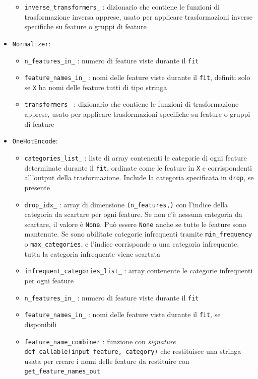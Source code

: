 \begin{itemize}
\begin{itemize}
        \item \texttt{inverse\_transformers\_} : dizionario che contiene le funzioni di trasformazione inversa apprese, usato per applicare trasformazioni inverse specifiche su feature o gruppi di feature
    \end{itemize}
    \item \texttt{Normalizer}:
    \begin{itemize}
        \item \texttt{n\_features\_in\_} : numero di feature viste durante il \texttt{fit}
        \item \texttt{feature\_names\_in\_} : nomi delle feature viste durante il \texttt{fit}, definiti solo se \texttt{X} ha nomi delle feature tutti di tipo stringa
        \item \texttt{transformers\_} : dizionario che contiene le funzioni di trasformazione apprese, usato per applicare trasformazioni specifiche su feature o gruppi di feature
    \end{itemize}
    \item \texttt{OneHotEncode}: 
    \begin{itemize}
        \item \texttt{categories\_list\_} : liste di array contenenti le categorie di ogni feature determinate durante il \texttt{fit}, ordinate come le feature in \texttt{X} e corrispondenti all'output della trasformazione. Include la categoria specificata in \texttt{drop}, se presente
        \item \texttt{drop\_idx\_} : array di dimensione \texttt{(n\_features,)} con l'indice della categoria da scartare per ogni feature. Se non c'è nessuna categoria da scartare, il valore è \texttt{None}. Può essere \texttt{None} anche se tutte le feature sono mantenute. Se sono abilitate categorie infrequenti tramite \texttt{min\_frequency} o \texttt{max\_categories}, e l'indice corrisponde a una categoria infrequente, tutta la categoria infrequente viene scartata
        \item \texttt{infrequent\_categories\_list\_} : array contenente le categorie infrequenti per ogni feature
        \item \texttt{n\_features\_in\_} : numero di feature viste durante il \texttt{fit}
        \item \texttt{feature\_names\_in\_} : nomi delle feature viste durante il \texttt{fit}, se disponibili
        \item \texttt{feature\_name\_combiner} : funzione con \textit{signature} \\ \texttt{def callable(input\_feature, category)} che restituisce una stringa usata per creare i nomi delle feature da restituire con \\ \texttt{get\_feature\_names\_out}

\end{itemize}
\end{itemize}
